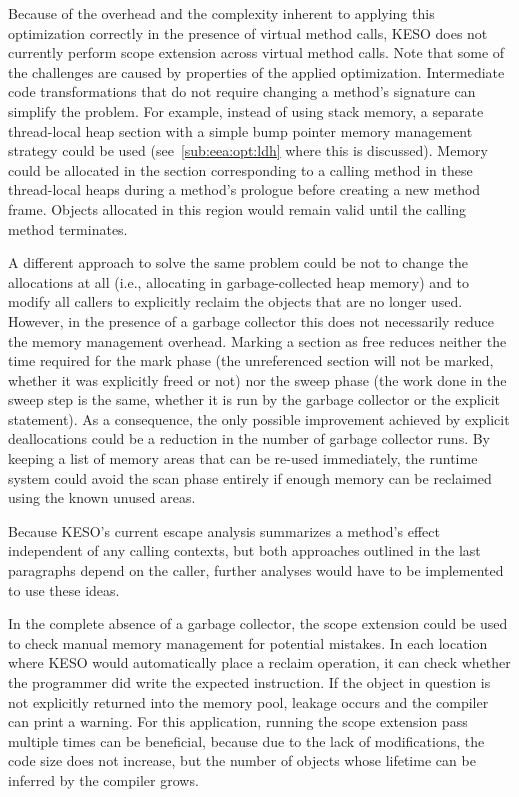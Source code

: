 			Because of the overhead and the complexity inherent to applying this optimization correctly in the presence of
			virtual method calls, KESO does not currently perform scope extension across virtual method calls. Note that some
			of the challenges are caused by properties of the applied optimization. Intermediate code transformations that do
			not require changing a method's signature can simplify the problem. For example, instead of using stack memory,
			a separate thread-local heap section with a simple bump pointer memory management strategy could be used
			(see~\cref{sub:eea:opt:ldh} where this is discussed). Memory could be allocated in the section corresponding to
			a calling method in these thread-local heaps during a method's prologue before creating a new method frame.
			Objects allocated in this region would remain valid until the calling method terminates.

			A different approach to solve the same problem could be not to change the allocations at all (i.e., allocating in
			garbage-collected heap memory) and to modify all callers to explicitly reclaim the objects that are no longer
			used. However, in the presence of a garbage collector this does not necessarily reduce the memory management
			overhead. Marking a section as free reduces neither the time required for the mark phase (the unreferenced section
			will not be marked, whether it was explicitly freed or not) nor the sweep phase (the work done in the sweep step
			is the same, whether it is run by the garbage collector or the explicit statement). As a consequence, the only
			possible improvement achieved by explicit deallocations could be a reduction in the number of garbage collector
			runs. By keeping a list of memory areas that can be re-used immediately, the runtime system could avoid the scan
			phase entirely if enough memory can be reclaimed using the known unused areas.

			Because KESO's current escape analysis summarizes a method's effect independent of any calling contexts, but both
			approaches outlined in the last paragraphs depend on the caller, further analyses would have to be implemented to
			use these ideas.

			In the complete absence of a garbage collector, the scope extension could be used to check manual memory
			management for potential mistakes. In each location where KESO would automatically place a reclaim operation, it
			can check whether the programmer did write the expected instruction. If the object in question is not explicitly
			returned into the memory pool, leakage occurs and the compiler can print a warning. For this application, running
			the scope extension pass multiple times can be beneficial, because due to the lack of modifications, the code size
			does not increase, but the number of objects whose lifetime can be inferred by the compiler grows.

